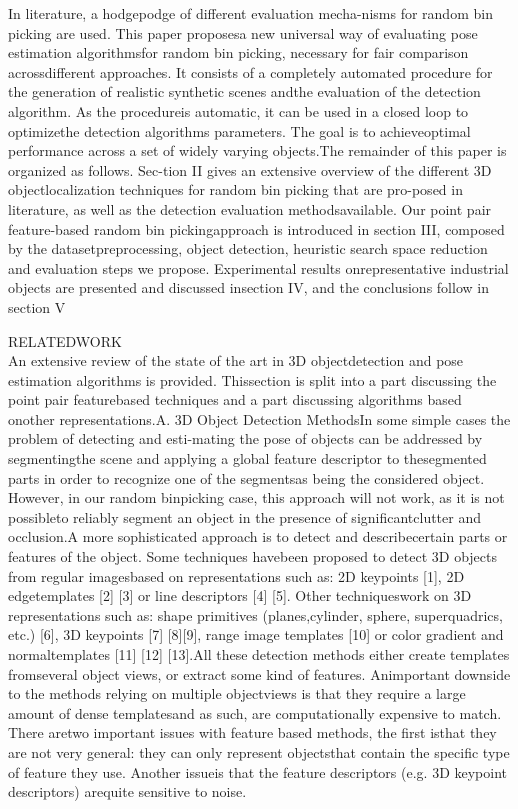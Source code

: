 \documentclass[10]{article}
\begin{document}
In literature, a hodgepodge of different evaluation mecha-nisms for random bin picking are used. This paper proposesa new universal way of evaluating pose estimation algorithmsfor random bin picking, necessary for fair comparison acrossdifferent approaches. It consists of a completely automated procedure for the generation of realistic synthetic scenes andthe evaluation of the detection algorithm. As the procedureis automatic, it can be used in a closed loop to optimizethe detection algorithms parameters. The goal is to achieveoptimal performance across a set of widely varying objects.The remainder of this paper is organized as follows. Sec-tion II gives an extensive overview of the different 3D objectlocalization techniques for random bin picking that are pro-posed in literature, as well as the detection evaluation methodsavailable. Our point pair feature-based random bin pickingapproach is introduced in section III, composed by the datasetpreprocessing, object detection, heuristic search space reduction and evaluation steps we propose. Experimental results onrepresentative industrial objects are presented and discussed insection IV, and the conclusions follow in section V

RELATEDWORK\\
An extensive review of the state of the art in 3D objectdetection and pose estimation algorithms is provided. Thissection is split into a part discussing the point pair featurebased techniques and a part discussing algorithms based onother representations.A. 3D Object Detection MethodsIn some simple cases the problem of detecting and esti-mating the pose of objects can be addressed by segmentingthe scene and applying a global feature descriptor to thesegmented parts in order to recognize one of the segmentsas being the considered object. However, in our random binpicking case, this approach will not work, as it is not possibleto reliably segment an object in the presence of significantclutter and occlusion.A more sophisticated approach is to detect and describecertain parts or features of the object. Some techniques havebeen proposed to detect 3D objects from regular imagesbased on representations such as: 2D keypoints [1], 2D edgetemplates [2] [3] or line descriptors [4] [5]. Other techniqueswork on 3D representations such as: shape primitives (planes,cylinder, sphere, superquadrics, etc.) [6], 3D keypoints [7] [8][9], range image templates [10] or color gradient and normaltemplates [11] [12] [13].All these detection methods either create templates fromseveral object views, or extract some kind of features. Animportant downside to the methods relying on multiple objectviews is that they require a large amount of dense templatesand as such, are computationally expensive to match. There aretwo important issues with feature based methods, the first isthat they are not very general: they can only represent objectsthat contain the specific type of feature they use. Another issueis that the feature descriptors (e.g. 3D keypoint descriptors) arequite sensitive to noise.
\end{document}
